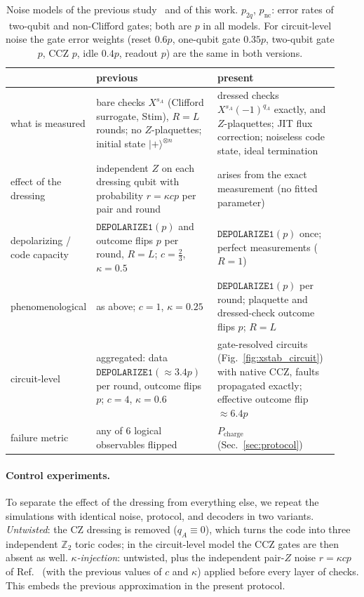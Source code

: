 \documentclass[a4paper]{article}
\providecommand{\ket}[1]{\ensuremath{|#1\rangle}}
\begin{document}
\begin{table}[t]
\centering
\caption{Noise models of the previous study~\cite{haga2026aqis} and of this work. $p_{2q}$, $p_{\mathrm{nc}}$: error rates of two-qubit and non-Clifford gates; both are $p$ in all models. For circuit-level noise the gate error weights (reset $0.6p$, one-qubit gate $0.35p$, two-qubit gate $p$, CCZ $p$, idle $0.4p$, readout $p$) are the same in both versions.}
\label{tab:noise}
\small
\renewcommand{\arraystretch}{1.15}
\begin{tabular}{p{0.15\linewidth}p{0.39\linewidth}p{0.39\linewidth}}
\toprule
 & previous~\cite{haga2026aqis} & present \\
\midrule
what is measured & bare checks $X^{s_A}$ (Clifford surrogate, Stim), $R=L$ rounds; no $Z$-plaquettes; initial state $\ket{+}^{\otimes n}$ & dressed checks $X^{s_A}(-1)^{q_A}$ exactly, and $Z$-plaquettes; JIT flux correction; noiseless code state, ideal termination \\
effect of the dressing & independent $Z$ on each dressing qubit with probability $r=\kappa cp$ per pair and round & arises from the exact measurement (no fitted parameter) \\
\midrule
depolarizing / code capacity & $\mathtt{DEPOLARIZE1}(p)$ and outcome flips $p$ per round, $R=L$; $c=\tfrac23$, $\kappa=0.5$ & $\mathtt{DEPOLARIZE1}(p)$ once; perfect measurements ($R=1$) \\
phenomenological & as above; $c=1$, $\kappa=0.25$ & $\mathtt{DEPOLARIZE1}(p)$ per round; plaquette and dressed-check outcome flips $p$; $R=L$ \\
circuit-level & aggregated: data $\mathtt{DEPOLARIZE1}(\approx3.4p)$ per round, outcome flips $p$; $c=4$, $\kappa=0.6$ & gate-resolved circuits (Fig.~\ref{fig:xstab_circuit}) with native CCZ, faults propagated exactly; effective outcome flip $\approx6.4p$ \\
\midrule
failure metric & any of 6 logical observables flipped & $P_{\mathrm{charge}}$ (Sec.~\ref{sec:protocol}) \\
\bottomrule
\end{tabular}
\end{table}

\paragraph{Control experiments.}
To separate the effect of the dressing from everything else, we repeat the simulations with identical noise, protocol, and decoders in two variants. \emph{Untwisted}: the CZ dressing is removed ($q_A\equiv0$), which turns the code into three independent $\mathbb{Z}_2$ toric codes; in the circuit-level model the CCZ gates are then absent as well. \emph{$\kappa$-injection}: untwisted, plus the independent pair-$Z$ noise $r=\kappa cp$ of Ref.~\cite{haga2026aqis} (with the previous values of $c$ and $\kappa$) applied before every layer of checks. This embeds the previous approximation in the present protocol.
\end{document}
